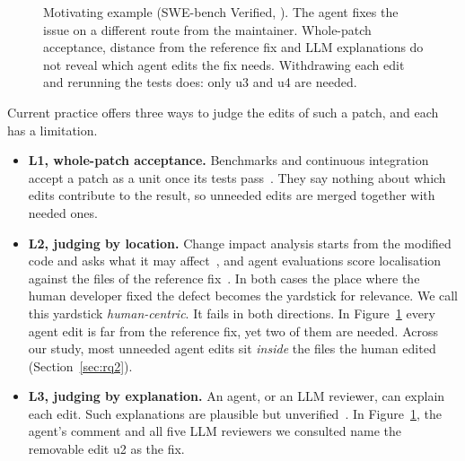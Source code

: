 \documentclass[a4paper,fleqn]{cas-sc}
\newcommand{\tool}{\textsc{Shift}}
\newcommand{\code}[1]{\texttt{\detokenize{#1}}}
\begin{document}
\begin{figure}[pos=htbp]
{}
\caption{Motivating example (SWE-bench Verified, \code{django__django-13297}). The agent fixes the issue on a different route from the maintainer. Whole-patch acceptance, distance from the reference fix and LLM explanations do not reveal which agent edits the fix needs. Withdrawing each edit and rerunning the tests does: only u3 and u4 are needed.}
\label{fig:motivation}
\end{figure}

Current practice offers three ways to judge the edits of such a patch, and each has a limitation.
\begin{itemize}
\item \textbf{L1, whole-patch acceptance.} Benchmarks and continuous integration accept a patch as a unit once its tests pass~\citep{jimenez2024swebench}. They say nothing about which edits contribute to the result, so unneeded edits are merged together with needed ones.
\item \textbf{L2, judging by location.} Change impact analysis starts from the modified code and asks what it may affect~\citep{bohner1996cia,li2013cia,ren2004chianti}, and agent evaluations score localisation against the files of the reference fix~\citep{xia2025agentless}. In both cases the place where the human developer fixed the defect becomes the yardstick for relevance. We call this yardstick \emph{human-centric}. It fails in both directions. In Figure~\ref{fig:motivation} every agent edit is far from the reference fix, yet two of them are needed. Across our study, most unneeded agent edits sit \emph{inside} the files the human edited (Section~\ref{sec:rq2}).
\item \textbf{L3, judging by explanation.} An agent, or an LLM reviewer, can explain each edit. Such explanations are plausible but unverified~\citep{turpin2023unfaithful}. In Figure~\ref{fig:motivation}, the agent's comment and all five LLM reviewers we consulted name the removable edit u2 as the fix.
\end{itemize}
\end{document}
